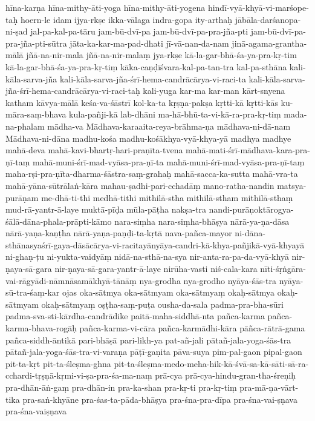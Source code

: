 {{hīna-karṇa
hīna-mithy-āti-yoga
hīna-mithy-āti-yogena
hindī-vyā-khyā-vi-marśope-taḥ
hoern-le
idam
ijya-rkṣe
ikka-vālaga
indra-gopa
ity-arthaḥ
jābāla-darśanopa-ni-ṣad
jal-pa-kal-pa-tāru
jam-bū-dvī-pa
jam-bū-dvī-pa-pra-jña-pti
jam-bū-dvī-pa-pra-jña-pti-sūtra
jāta-ka-kar-ma-pad-dhati
jī-vā-nan-da-nam
jinā-agama-grantha-mālā
jñā-na-nir-mala
jñā-na-nir-malaṃ
jya-rkṣe
kā-la-gar-bhā-śa-ya-pra-kṛ-tim
kā-la-gar-bhā-śa-ya-pra-kṛ-tiṃ
kāka-caṇḍīśvara-kal-pa-tan-tra
kal-pa-sthāna
kali-kāla-sarva-jña
kali-kāla-sarva-jña-śrī-hema-candrācārya-vi-raci-ta
kali-kāla-sarva-jña-śrī-hema-candrācārya-vi-raci-taḥ
kali-yuga
kar-ma
kar-man
kārt-snyena
katham
kāvya-mālā
keśa-va-śāstrī
kol-ka-ta
kṛṣṇa-pakṣa
kṛtti-kā
kṛtti-kās
ku-māra-saṃ-bhava
kula-pañji-kā
lab-dhāni
ma-hā-bhū-ta-vi-kā-ra-pra-kṛ-tiṃ
mada-na-phalam
mādha-va
Mādhava-karaaita-reya-brāhma-ṇa
mādhava-ni-dā-nam
Mādhava-ni-dāna
madhu-kośa
madhu-kośākhya-vyā-khya-yā
madhya
madhye
mahā-deva
mahā-kavi-bhartṛ-hari-praṇīta-tvena
mahā-mati-śrī-mādhava-kara-pra-ṇī-taṃ
mahā-muni-śrī-mad-vyāsa-pra-ṇī-ta
mahā-muni-śrī-mad-vyāsa-pra-ṇī-taṃ
maha-rṣi-pra-ṇīta-dharma-śāstra-saṃ-grahaḥ
mahā-sacca-ka-sutta
mahā-vra-ta
mahā-yāna-sūtrālaṅ-kāra
mahau-ṣadhi-pari-cchadāṃ
mano-ratha-nandin
matsya-purāṇam
me-dhā-ti-thi
medhā-tithi
mithilā-stha
mithilā-stham
mithilā-sthaṃ
mud-rā-yantr-ā-laye
muktā-pīḍa
mūla-pāṭha
nakṣa-tra
nandi-purāṇoktārogya-śālā-dāna-phala-prāpti-kāmo
nara-siṃha
nara-siṃha-bhāṣya
nārā-ya-ṇa-dāsa
nārā-yaṇa-kaṇṭha
nārā-yaṇa-paṇḍi-ta-kṛtā
nava-pañca-mayor
ni-dāna-sthānasyaśrī-gaya-dāsācārya-vi-racitayānyāya-candri-kā-khya-pañjikā-vyā-khyayā
ni-ghaṇ-ṭu
ni-yukta-vaidyāṃ
nidā-na-sthā-na-sya
nir-anta-ra-pa-da-vyā-khyā
nir-ṇaya-sā-gara
nir-ṇaya-sā-gara-yantr-ā-laye
nirūha-vasti
niś-cala-kara
nīti-śṛṅgāra-vai-rāgyādi-nāmnāsamākhyā-tānāṃ
nya-grodha
nya-grodho
nyāya-śās-tra
nyāya-sū-tra-śaṃ-kar
ojas
oka-sātmya
oka-sātmyam
oka-sātmyaṃ
okaḥ-sātmya
okaḥ-sātmyam
okaḥ-sātmyaṃ
oṣṭha-saṃ-puṭa
ousha-da-sala
padma-pra-bha-sūri
padma-sva-sti-kārdha-candrādike
paitā-maha-siddhā-nta
pañca-karma
pañca-karma-bhava-rogāḥ
pañca-karma-vi-cāra
pañca-karmādhi-kāra
pāñca-rātrā-gama
pañca-siddh-āntikā
pari-bhāṣā
pari-likh-ya
pat-añ-jali
pātañ-jala-yoga-śās-tra
pātañ-jala-yoga-śās-tra-vi-varaṇa
pāṭī-gaṇita
pāva-suya
pim-pal-gaon
pipal-gaon
pit-ta-kṛt
pit-ta-śleṣma-ghna
pit-ta-śleṣma-medo-meha-hik-kā-śvā-sa-kā-sāti-sā-ra-cchardi-tṛṣṇā-kṛmi-vi-ṣa-pra-śa-ma-naṃ
prā-cya
prā-cya-hindu-gran-tha-śreṇiḥ
pra-dhān-āṅ-gaṃ
pra-dhān-in
pra-ka-shan
pra-kṛ-ti
pra-kṛ-tiṃ
pra-mā-ṇa-vārt-tika
pra-saṅ-khyāne
pra-śas-ta-pāda-bhāṣya
pra-śna-pra-dīpa
pra-śna-vai-ṣṇava
pra-śna-vaiṣṇava
}}
